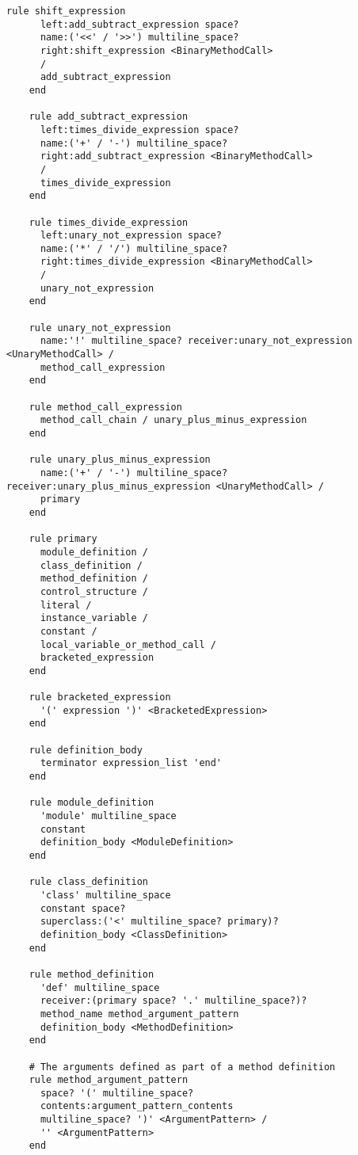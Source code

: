 \begin{lstlisting}[title={\small\ttfamily\bfseries parser/language.treetop},language=treetop]
    rule shift_expression
      left:add_subtract_expression space?
      name:('<<' / '>>') multiline_space?
      right:shift_expression <BinaryMethodCall>
      /
      add_subtract_expression
    end
    
    rule add_subtract_expression
      left:times_divide_expression space?
      name:('+' / '-') multiline_space?
      right:add_subtract_expression <BinaryMethodCall>
      /
      times_divide_expression
    end
    
    rule times_divide_expression
      left:unary_not_expression space?
      name:('*' / '/') multiline_space?
      right:times_divide_expression <BinaryMethodCall>
      /
      unary_not_expression
    end
    
    rule unary_not_expression
      name:'!' multiline_space? receiver:unary_not_expression <UnaryMethodCall> /
      method_call_expression
    end
    
    rule method_call_expression
      method_call_chain / unary_plus_minus_expression
    end
    
    rule unary_plus_minus_expression
      name:('+' / '-') multiline_space? receiver:unary_plus_minus_expression <UnaryMethodCall> /
      primary
    end
    
    rule primary
      module_definition /
      class_definition /
      method_definition /
      control_structure /
      literal /
      instance_variable /
      constant /
      local_variable_or_method_call /
      bracketed_expression
    end
    
    rule bracketed_expression
      '(' expression ')' <BracketedExpression>
    end
    
    rule definition_body
      terminator expression_list 'end'
    end
    
    rule module_definition
      'module' multiline_space
      constant
      definition_body <ModuleDefinition>
    end
    
    rule class_definition
      'class' multiline_space
      constant space?
      superclass:('<' multiline_space? primary)?
      definition_body <ClassDefinition>
    end
    
    rule method_definition
      'def' multiline_space
      receiver:(primary space? '.' multiline_space?)?
      method_name method_argument_pattern
      definition_body <MethodDefinition>
    end
    
    # The arguments defined as part of a method definition
    rule method_argument_pattern
      space? '(' multiline_space?
      contents:argument_pattern_contents
      multiline_space? ')' <ArgumentPattern> /
      '' <ArgumentPattern>
    end
    

\end{lstlisting}
